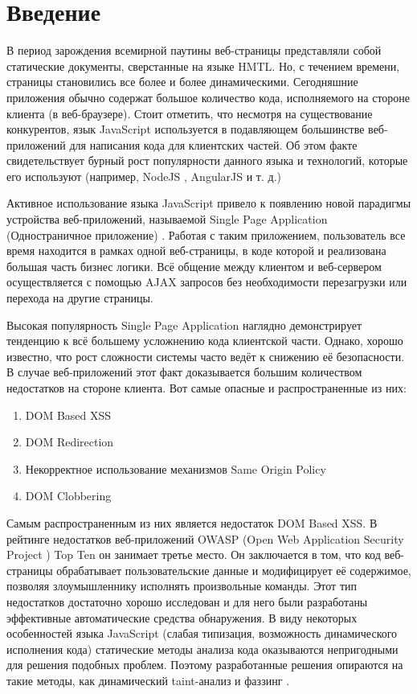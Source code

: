 
\chapter{Введение}\label{Introduction}

В период зарождения всемирной паутины веб-страницы представляли собой статические документы, сверстанные на языке HMTL. Но, с течением времени, страницы становились все более и более динамическими. Сегодняшние приложения обычно содержат большое количество кода, исполняемого на стороне клиента (в веб-браузере). Стоит отметить, что несмотря на существование конкурентов, язык JavaScript используется в подавляющем большинстве веб-приложений для написания кода для клиентских частей. Об этом факте свидетельствует бурный рост популярности данного языка и технологий, которые его используют (например, NodeJS \cite{nodejs}, AngularJS \cite{angularjs} и т. д.)


Активное использование языка JavaScript привело к появлению новой парадигмы устройства веб-приложений, называемой Single Page Application (Одностраничное приложение) \cite{spa}. Работая с таким приложением, пользователь все время находится в рамках одной веб-страницы, в коде которой и реализована большая часть бизнес логики. Всё общение между клиентом и веб-сервером осуществляется с помощью AJAX \cite{ajax} запросов без необходимости перезагрузки или перехода на другие страницы.


Высокая популярность Single Page Application наглядно демонстрирует тенденцию к всё большему усложнению кода клиентской части. Однако, хорошо известно, что рост сложности системы часто ведёт к снижению её безопасности. В случае веб-приложений этот факт доказывается большим количеством недостатков на стороне клиента. Вот самые опасные и распространенные из них:

\begin{enumerate}
	\item DOM Based XSS \cite{domxss}
	\item DOM Redirection \cite{domredirect}
	\item Некорректное использование механизмов Same Origin Policy \cite{sop}
	\item DOM Clobbering
\end{enumerate}


Самым распространенным из них является недостаток DOM Based XSS. В рейтинге недостатков веб-приложений OWASP (Open Web Application Security Project \cite{owasp}) Top Ten \cite{topten} он занимает третье место. Он заключается в том, что код веб-страницы обрабатывает пользовательские данные и модифицирует её содержимое, позволяя злоумышленнику исполнять произвольные команды. Этот тип недостатков достаточно хорошо исследован и для него были разработаны эффективные автоматические средства обнаружения. В виду некоторых особенностей языка JavaScript \cite{Richards2010} (слабая типизация, возможность динамического исполнения кода) статические методы анализа кода оказываются непригодными для решения подобных проблем. Поэтому разработанные решения опираются на такие методы, как динамический taint-анализ и фаззинг \cite{miller}.


